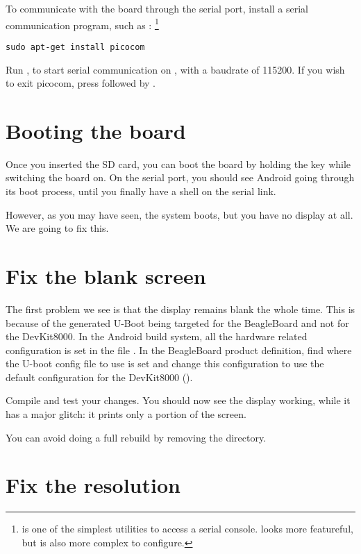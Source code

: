 To communicate with the board through the serial port, install a
serial communication program, such as :
\footnote{ is one of the simplest utilities to access a
  serial console.  looks more featureful, but is also
  more complex to configure.}

\begin{verbatim}
sudo apt-get install picocom
\end{verbatim}

Run , to start serial
communication on , with a baudrate of 115200. If
you wish to exit picocom, press \code{[Ctrl][a]} followed by
\code{[Ctrl][x]}.

\section{Booting the board}

Once you inserted the SD card, you can boot the board by holding the
 key while switching the board on. On the serial port, you
should see Android going through its boot process, until you finally
have a shell on the serial link.

However, as you may have seen, the system boots, but you have no
display at all. We are going to fix this.

\section{Fix the blank screen}

The first problem we see is that the display remains blank the whole
time. This is because of the generated U-Boot being targeted for the
BeagleBoard and not for the DevKit8000. In the Android build system,
all the hardware related configuration is set in the file
. In the BeagleBoard product definition, find
where the U-boot config file to use is set and change this
configuration to use the default configuration for the DevKit8000
().

Compile and test your changes. You should now see the display working,
while it has a major glitch: it prints only a portion of the screen.

You can avoid doing a full rebuild by removing the
 directory.

\section{Fix the resolution}


